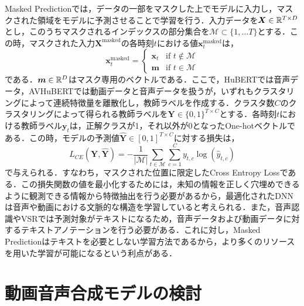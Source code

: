 \documentclass[12pt]{jarticle}
\numberwithin{equation}{section}    %
\numberwithin{figure}{section}      %
\numberwithin{table}{section}      %
\begin{document}
Masked Predictionでは，データの一部をマスクした上でモデルに入力し，マスクされた領域をモデルに予測させることで学習を行う．入力データを$\bm{X} \in \mathbb{R}^{T \times D}$とし，このうちマスクされるインデックスの部分集合を$\mathcal{M} \subset \{ 1, \ldots T \}$とする．この時，マスクされた入力$\bm{X}^{\text{masked}}$の各時刻$t$における値$\bm{x}^{\text{masked}}_{t}$は，
\begin{equation}
    \bm{x}^{\text{masked}}_{t} =
    \begin{cases}
        \bm{x}_{t} & \text{if $t \notin \mathcal{M}$} \\
        \bm{m}     & \text{if $t \in \mathcal{M}$}
    \end{cases}
\end{equation}
である．$\bm{m} \in \mathbb{R}^{D}$はマスク専用のベクトルである．ここで，HuBERTでは音声データ，AVHuBERTでは動画データと音声データを扱うが，いずれもクラスタリングによって連続特徴量を離散化し，教師ラベルを作成する．クラスタ数$C$のクラスタリングによって得られる教師ラベルを$\bm{Y} \in \{0, 1\}^{T \times C}$とする．各時刻$t$における教師ラベル$\bm{y}_{t}$は，正解クラスが1，それ以外が0となったOne-hotベクトルである．この時，モデルの予測値$\hat{\bm{Y}} \in [0, 1]^{T \times C}$に対する損失は，
\begin{equation}
    L_{CE}(\bm{Y}, \hat{\bm{Y}}) =
    - \frac{1}{|\mathcal{M}|} \sum_{t \in \mathcal{M}} \sum_{c = 1}^{C} y_{t, c} \log (\hat{y}_{t, c})
\end{equation}
で与えられる．すなわち，マスクされた位置に限定したCross Entropy Lossである．この損失関数の値を最小化するためには，未知の情報を正しく穴埋めできるように観測できる情報から特徴抽出を行う必要があるから，最適化されたDNNは音声や動画における文脈的な構造を学習していると考えられる．また，音声認識やVSRでは予測対象がテキストになるため，音声データおよび動画データに対するテキストアノテーションを行う必要がある．これに対し，Masked Predictionはテキストを必要としない学習方法であるから，より多くのリソースを用いた学習が可能になるという利点がある．

\clearpage

\section{動画音声合成モデルの検討}
\end{document}
